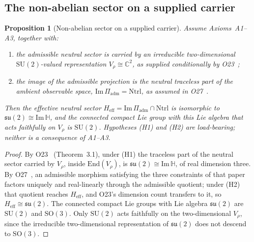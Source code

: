 \documentclass[11pt,a4paper]{article}
\newtheorem{proposition}[theorem]{Proposition}
\begin{document}
  \subsection{The non-abelian sector on a supplied carrier}
    \label{subsec:su2-rigidity}

    \begin{proposition}[Non-abelian sector on a supplied carrier]
      \label{thm:su2-rigidity}
      Assume Axioms~A1--A3, together with:
      \begin{enumerate}[(H1)]
        \item the admissible neutral sector is carried by an irreducible two-dimensional
        $\mathrm{SU}(2)$-valued representation $V_\rho \cong \mathbb{C}^2$, as supplied
        conditionally by O23~\cite{Beau2026a27};
        \item the image of the admissible projection is the neutral traceless part of the
        ambient observable space, $\mathrm{Im}\,\Pi_{\mathrm{adm}} = \mathrm{Ntrl}$, as assumed
        in O27~\cite{Beau2026a31}.
      \end{enumerate}
      Then the effective neutral sector $H_{\mathrm{eff}} = \mathrm{Im}\,\Pi_{\mathrm{adm}} \cap
      \mathrm{Ntrl}$ is isomorphic to $\mathfrak{su}(2) \cong \mathrm{Im}\,\mathbb{H}$, and the
      connected compact Lie group with this Lie algebra that acts faithfully on $V_\rho$ is
      $\mathrm{SU}(2)$.
      Hypotheses (H1) and (H2) are load-bearing; neither is a consequence of A1--A3.
    \end{proposition}

    \begin{proof}
        By O23~\cite{Beau2026a27} (Theorem~3.1), under (H1) the traceless part of the neutral
        sector carried by $V_\rho$, inside $\mathrm{End}(V_\rho)$, is
        $\mathfrak{su}(2) \cong \mathrm{Im}\,\mathbb{H}$, of real dimension three.
        By O27~\cite{Beau2026a31}, an admissible morphism satisfying the three constraints of that
        paper factors uniquely and real-linearly through the admissible quotient; under (H2)
        that quotient reaches $H_{\mathrm{eff}}$, and O23's dimension count transfers to it, so
        $H_{\mathrm{eff}} \cong \mathfrak{su}(2)$.
        The connected compact Lie groups with Lie algebra $\mathfrak{su}(2)$ are
        $\mathrm{SU}(2)$ and $\mathrm{SO}(3)$.
        Only $\mathrm{SU}(2)$ acts faithfully on the two-dimensional $V_\rho$, since the
        irreducible two-dimensional representation of $\mathfrak{su}(2)$ does not descend to
        $\mathrm{SO}(3)$.
    \end{proof}
\end{document}
